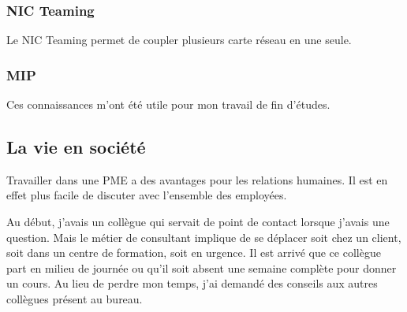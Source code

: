 \subsubsection{NIC Teaming}
Le NIC Teaming permet de coupler plusieurs carte réseau en une seule.

\subsubsection{MIP}



Ces connaissances m'ont été utile pour mon travail de fin d'études. 
\subsection{La vie en société}
Travailler dans une PME a des avantages pour les relations humaines.
Il est en effet plus facile de discuter avec l'ensemble des employées.

Au début, j'avais un collègue qui servait de point de contact lorsque j'avais une question.
Mais le métier de consultant implique de se déplacer soit chez un client, soit dans un centre de formation, soit en urgence.
Il est arrivé que ce collègue part en milieu de journée ou qu'il soit absent une semaine complète pour donner un cours.
Au lieu de perdre mon temps, j'ai demandé des conseils aux autres collègues présent au bureau. 

